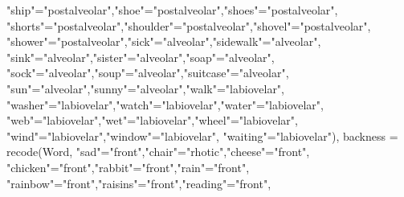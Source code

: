 \documentclass[
]{article}
\newenvironment{Shaded}{\begin{snugshade}}{\end{snugshade}}
\newcommand{\AttributeTok}[1]{\textcolor[rgb]{0.77,0.63,0.00}{#1}}
\newcommand{\FunctionTok}[1]{\textcolor[rgb]{0.00,0.00,0.00}{#1}}
\newcommand{\NormalTok}[1]{#1}
\newcommand{\OtherTok}[1]{\textcolor[rgb]{0.56,0.35,0.01}{#1}}
\newcommand{\StringTok}[1]{\textcolor[rgb]{0.31,0.60,0.02}{#1}}
\begin{document}
\begin{Shaded}
\begin{Highlighting}[]
                       \StringTok{"ship"}\OtherTok{=}\StringTok{"postalveolar"}\NormalTok{,}\StringTok{"shoe"}\OtherTok{=}\StringTok{"postalveolar"}\NormalTok{,}\StringTok{"shoes"}\OtherTok{=}\StringTok{"postalveolar"}\NormalTok{,}
                       \StringTok{"shorts"}\OtherTok{=}\StringTok{"postalveolar"}\NormalTok{,}\StringTok{"shoulder"}\OtherTok{=}\StringTok{"postalveolar"}\NormalTok{,}\StringTok{"shovel"}\OtherTok{=}\StringTok{"postalveolar"}\NormalTok{,}
                             \StringTok{"shower"}\OtherTok{=}\StringTok{"postalveolar"}\NormalTok{,}\StringTok{"sick"}\OtherTok{=}\StringTok{"alveolar"}\NormalTok{,}\StringTok{"sidewalk"}\OtherTok{=}\StringTok{"alveolar"}\NormalTok{,}
                             \StringTok{"sink"}\OtherTok{=}\StringTok{"alveolar"}\NormalTok{,}\StringTok{"sister"}\OtherTok{=}\StringTok{"alveolar"}\NormalTok{,}\StringTok{"soap"}\OtherTok{=}\StringTok{"alveolar"}\NormalTok{,}
                             \StringTok{"sock"}\OtherTok{=}\StringTok{"alveolar"}\NormalTok{,}\StringTok{"soup"}\OtherTok{=}\StringTok{"alveolar"}\NormalTok{,}\StringTok{"suitcase"}\OtherTok{=}\StringTok{"alveolar"}\NormalTok{,}
                             \StringTok{"sun"}\OtherTok{=}\StringTok{"alveolar"}\NormalTok{,}\StringTok{"sunny"}\OtherTok{=}\StringTok{"alveolar"}\NormalTok{,}\StringTok{"walk"}\OtherTok{=}\StringTok{"labiovelar"}\NormalTok{,}
                             \StringTok{"washer"}\OtherTok{=}\StringTok{"labiovelar"}\NormalTok{,}\StringTok{"watch"}\OtherTok{=}\StringTok{"labiovelar"}\NormalTok{,}\StringTok{"water"}\OtherTok{=}\StringTok{"labiovelar"}\NormalTok{,}
                        \StringTok{"web"}\OtherTok{=}\StringTok{"labiovelar"}\NormalTok{,}\StringTok{"wet"}\OtherTok{=}\StringTok{"labiovelar"}\NormalTok{,}\StringTok{"wheel"}\OtherTok{=}\StringTok{"labiovelar"}\NormalTok{,}
                             \StringTok{"wind"}\OtherTok{=}\StringTok{"labiovelar"}\NormalTok{,}\StringTok{"window"}\OtherTok{=}\StringTok{"labiovelar"}\NormalTok{, }\StringTok{"waiting"}\OtherTok{=}\StringTok{"labiovelar"}\NormalTok{),}
        \AttributeTok{backness =} \FunctionTok{recode}\NormalTok{(Word, }\StringTok{"sad"}\OtherTok{=}\StringTok{"front"}\NormalTok{,}\StringTok{"chair"}\OtherTok{=}\StringTok{"rhotic"}\NormalTok{,}\StringTok{"cheese"}\OtherTok{=}\StringTok{"front"}\NormalTok{,}
                       \StringTok{"chicken"}\OtherTok{=}\StringTok{"front"}\NormalTok{,}\StringTok{"rabbit"}\OtherTok{=}\StringTok{"front"}\NormalTok{,}\StringTok{"rain"}\OtherTok{=}\StringTok{"front"}\NormalTok{,}
                       \StringTok{"rainbow"}\OtherTok{=}\StringTok{"front"}\NormalTok{,}\StringTok{"raisins"}\OtherTok{=}\StringTok{"front"}\NormalTok{,}\StringTok{"reading"}\OtherTok{=}\StringTok{"front"}\NormalTok{,}

\end{Highlighting}
\end{Shaded}
\end{document}
